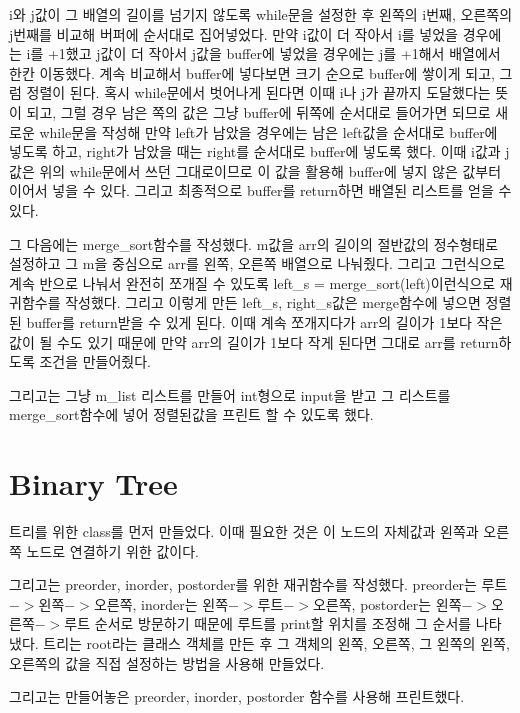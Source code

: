 \documentclass{article}
\begin{document}
i와 j값이 그 배열의 길이를 넘기지 않도록 while문을 설정한 후 왼쪽의 i번째, 오른쪽의 j번째를 비교해 버퍼에 순서대로 집어넣었다. 만약 i값이 더 작아서 i를 넣었을 경우에는 i를 +1했고 j값이 더 작아서 j값을 buffer에 넣었을 경우에는 j를 +1해서 배열에서 한칸 이동했다. 계속 비교해서 buffer에 넣다보면 크기 순으로 buffer에 쌓이게 되고, 그럼 정렬이 된다. 혹시 while문에서 벗어나게 된다면 이때 i나 j가 끝까지 도달했다는 뜻이 되고, 그럴 경우 남은 쪽의 값은 그냥 buffer에 뒤쪽에 순서대로 들어가면 되므로 새로운 while문을 작성해 만약 left가 남았을 경우에는 남은 left값을 순서대로 buffer에 넣도록 하고, right가 남았을 때는 right를 순서대로 buffer에 넣도록 했다. 이때 i값과 j값은 위의 while문에서 쓰던 그대로이므로 이 값을 활용해 buffer에 넣지 않은 값부터 이어서 넣을 수 있다. 그리고 최종적으로 buffer를 return하면 배열된 리스트를 얻을 수 있다.

그 다음에는 merge\_sort함수를 작성했다. m값을 arr의 길이의 절반값의 정수형태로 설정하고 그 m을 중심으로 arr를 왼쪽, 오른쪽 배열으로 나눠줬다. 그리고 그런식으로 계속 반으로 나눠서 완전히 쪼개질 수 있도록 left\_s = merge\_sort(left)이런식으로 재귀함수를 작성했다. 그리고 이렇게 만든 left\_s, right\_s값은 merge함수에 넣으면 정렬된 buffer를 return받을 수 있게 된다. 이때 계속 쪼개지다가 arr의 길이가 1보다 작은 값이 될 수도 있기 때문에 만약 arr의 길이가 1보다 작게 된다면 그대로 arr를 return하도록 조건을 만들어줬다.

그리고는 그냥 m\_list 리스트를 만들어 int형으로 input을 받고 그 리스트를 merge\_sort함수에 넣어 정렬된값을 프린트 할 수 있도록 했다.

\section{Binary Tree}
트리를 위한 class를 먼저 만들었다. 이때 필요한 것은 이 노드의 자체값과 왼쪽과 오른쪽 노드로 연결하기 위한 값이다.

그리고는 preorder, inorder, postorder를 위한 재귀함수를 작성했다. preorder는 루트$->$왼쪽$->$오른쪽, inorder는 왼쪽$->$루트$->$오른쪽, postorder는 왼쪽$->$오른쪽$->$루트 순서로 방문하기 때문에 루트를 print할 위치를 조정해 그 순서를 나타냈다. 트리는 root라는 클래스 객체를 만든 후 그 객체의 왼쪽, 오른쪽, 그 왼쪽의 왼쪽, 오른쪽의 값을 직접 설정하는 방법을 사용해 만들었다.

그리고는 만들어놓은 preorder, inorder, postorder 함수를 사용해 프린트했다.
\end{document}
